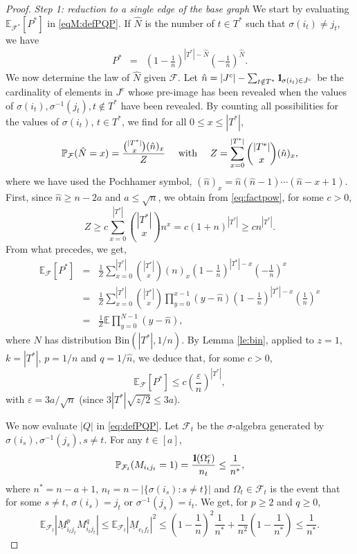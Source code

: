 \documentclass[11pt]{article}
\newcommand{\dE}{\mathbb {E}}
\newcommand{\dP}{\mathbb{P}}
\newcommand{\cF}{\mathcal {F}}
\newcommand{\Bin}{ \mathrm{Bin}}
\newcommand{\SBRA}[1]{{{\left[#1\right]}}} %
\newcommand{\PAR}[1]{{{\left(#1\right)}}} %
\newcommand{\1}{1\!\!{\sf I}}\newcommand{\IND}{\1}
\newcommand{\veps}{\varepsilon}
\newcommand{\si}{\sigma}
\begin{document}
\begin{proof}  {\em Step 1: reduction to a single edge of the base graph}
We start by evaluating $ \dE_{\cF^*} \SBRA{P^*}$ in \eqref{eqM:defPQP}. If $\hat N$ is the number of $t \in T^*$ such that $\sigma(i_t) \ne j_t$, we have 
\begin{eqnarray*}
 P^*   & =&  \PAR{ 1 - \frac 1 n}^{|T^* |  - \hat N} \PAR{ - \frac 1 n}^{\hat N}. 
\end{eqnarray*}
 We now determine the law of $\hat N$ given $\cF$. Let $\hat n = |J ^c| -   \sum_{t \notin T^*}\IND_{ \si(i_t) \in J ^c} $ be the cardinality of elements in $J^c$ whose pre-image has been revealed when the values of $\sigma(i_t), \sigma^{-1}(j_t) , t \notin  T^* $ have been revealed. By counting all possibilities for the values of $\sigma(i_t)$, $t \in T^*$, we find for all $0 \leq x \leq |T^*|$, 
$$
\dP_{\cF} ( \hat N = x) = \frac{{|T^*| \choose x} ( \hat  n )_{  x} }{Z}\quad \hbox{ with } \quad Z = \sum_{x = 0}^{|T^*|} {|T^*| \choose x} ( \hat  n )_{x} ,
$$
where we have used the Pochhamer symbol, $(\hat n)_x = \hat n(\hat n -1) \cdots (\hat n - x + 1)$.  First, since $\hat n \geq n - 2a$ and $a \leq  \sqrt{n}$, we obtain from \eqref{eq:factpow}, for some $c >0$, 
$$
Z \geq c \sum_{x = 0}^{|T^*|} {|T^*| \choose x}  n^{x}   = c ( 1+ n)^{|T^*|} \geq  c n^{|T^*|}. 
$$
From what precedes, we get, 
\begin{eqnarray*}
\dE_\cF \SBRA{P^*}  &=& \frac 1 Z \sum_{x = 0} ^{|T^*|} {|T^*| \choose x}  (n )_{x} \PAR{ 1 - \frac 1 n}^{|T^* |  - x} \PAR{ - \frac 1 n}^{x}\\
 & = &  \frac 1 Z \sum_{x = 0} ^{|T^*|} {|T^*| \choose x}  \prod_{y=0}^{x-1} ( y -  \hat n) \PAR{ 1 - \frac 1 n}^{|T^* |  - x} \PAR{ \frac 1 n}^{x} \\
& = &   \frac 1 Z \dE  \prod_{y=0}^{N-1} ( y -  \hat n ),
\end{eqnarray*}
where $N$ has distribution $\Bin(|T^* | , 1 / n)$. By Lemma \ref{le:bin}, applied to $z = 1$,  $k =|T^* | $, $p = 1 / n$ and $q = 1 / \hat n$, we deduce that, for some $c >0$, 
\begin{equation}\label{eqM:ddett}
\dE_\cF \SBRA{P^*} \leq c \PAR{ \frac{\veps}{n} }^{|T^*|} ,
\end{equation}
with $\veps =   3 a  / \sqrt n$ (since $3 |T^*| \sqrt{ z /2 } \leq 3a$). 


We now evaluate $|Q|$ in \eqref{eq:defPQP}. Let $\cF_t$ be the $\sigma$-algebra generated by $ \sigma(i_s), \sigma^{-1}(j_s) , s \ne t$. For any  $ t \in [ a]$, 
\begin{equation}\label{eqM:MeftP}
\dP_{\cF_t} ( M_{i_t j_t} = 1 )  = \frac{\IND( \Omega^c _t) } { n_t } \leq \frac{ 1} { n^*}, 
\end{equation}
where $n^* = n - a +1$, $n_t = n - | \{  \sigma(i_s) : s \ne t \}|$ and $\Omega_t \in \cF_t$ is the event that for some $s \ne t$, $\sigma(i_s) = j_t$ or $\sigma^{-1}(j_s) = i_t$. 
We get, for $p \geq 2$ and $q\geq 0$,
\begin{equation} \label{eqM:rdj20}
\dE_{\cF_t}  | \underline M_{i_t j_t} ^p M_{i_t j_t}^q |  \leq \dE_{\cF_t}   | \underline M_{e_t f_t} |^2   \leq\PAR{ 1 - \frac 1 n }^2  \frac{ 1} {n^*}  + \frac{1}{n^2}   \PAR{ 1 -  \frac{ 1} { n^*} } \leq \frac{1}{n^*}. 
\end{equation}


\end{proof}
\end{document}
